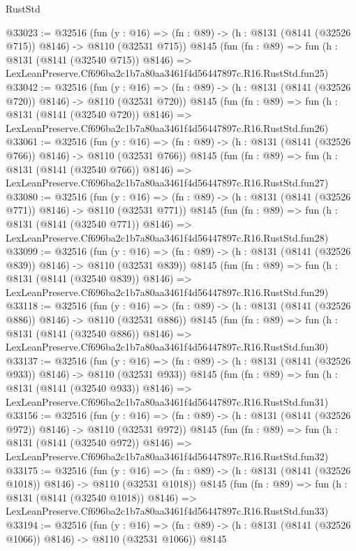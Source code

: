 \begin{lexlean}{RustStd}
\begin{coremodule}
@33023 := @32516
    (fun (y : @16) => (fn : @89) -> (h : @8131 (@8141 (@32526 @715)) @8146) -> @8110 (@32531 @715))
    @8145
    (fun (fn : @89) =>
    fun (h : @8131 (@8141 (@32540 @715)) @8146) =>
    LexLeanPreserve.Cf696ba2c1b7a80aa3461f4d56447897c.R16.RustStd.fun25)
@33042 := @32516
    (fun (y : @16) => (fn : @89) -> (h : @8131 (@8141 (@32526 @720)) @8146) -> @8110 (@32531 @720))
    @8145
    (fun (fn : @89) =>
    fun (h : @8131 (@8141 (@32540 @720)) @8146) =>
    LexLeanPreserve.Cf696ba2c1b7a80aa3461f4d56447897c.R16.RustStd.fun26)
@33061 := @32516
    (fun (y : @16) => (fn : @89) -> (h : @8131 (@8141 (@32526 @766)) @8146) -> @8110 (@32531 @766))
    @8145
    (fun (fn : @89) =>
    fun (h : @8131 (@8141 (@32540 @766)) @8146) =>
    LexLeanPreserve.Cf696ba2c1b7a80aa3461f4d56447897c.R16.RustStd.fun27)
@33080 := @32516
    (fun (y : @16) => (fn : @89) -> (h : @8131 (@8141 (@32526 @771)) @8146) -> @8110 (@32531 @771))
    @8145
    (fun (fn : @89) =>
    fun (h : @8131 (@8141 (@32540 @771)) @8146) =>
    LexLeanPreserve.Cf696ba2c1b7a80aa3461f4d56447897c.R16.RustStd.fun28)
@33099 := @32516
    (fun (y : @16) => (fn : @89) -> (h : @8131 (@8141 (@32526 @839)) @8146) -> @8110 (@32531 @839))
    @8145
    (fun (fn : @89) =>
    fun (h : @8131 (@8141 (@32540 @839)) @8146) =>
    LexLeanPreserve.Cf696ba2c1b7a80aa3461f4d56447897c.R16.RustStd.fun29)
@33118 := @32516
    (fun (y : @16) => (fn : @89) -> (h : @8131 (@8141 (@32526 @886)) @8146) -> @8110 (@32531 @886))
    @8145
    (fun (fn : @89) =>
    fun (h : @8131 (@8141 (@32540 @886)) @8146) =>
    LexLeanPreserve.Cf696ba2c1b7a80aa3461f4d56447897c.R16.RustStd.fun30)
@33137 := @32516
    (fun (y : @16) => (fn : @89) -> (h : @8131 (@8141 (@32526 @933)) @8146) -> @8110 (@32531 @933))
    @8145
    (fun (fn : @89) =>
    fun (h : @8131 (@8141 (@32540 @933)) @8146) =>
    LexLeanPreserve.Cf696ba2c1b7a80aa3461f4d56447897c.R16.RustStd.fun31)
@33156 := @32516
    (fun (y : @16) => (fn : @89) -> (h : @8131 (@8141 (@32526 @972)) @8146) -> @8110 (@32531 @972))
    @8145
    (fun (fn : @89) =>
    fun (h : @8131 (@8141 (@32540 @972)) @8146) =>
    LexLeanPreserve.Cf696ba2c1b7a80aa3461f4d56447897c.R16.RustStd.fun32)
@33175 := @32516
    (fun (y : @16) =>
    (fn : @89) -> (h : @8131 (@8141 (@32526 @1018)) @8146) -> @8110 (@32531 @1018))
    @8145
    (fun (fn : @89) =>
    fun (h : @8131 (@8141 (@32540 @1018)) @8146) =>
    LexLeanPreserve.Cf696ba2c1b7a80aa3461f4d56447897c.R16.RustStd.fun33)
@33194 := @32516
    (fun (y : @16) =>
    (fn : @89) -> (h : @8131 (@8141 (@32526 @1066)) @8146) -> @8110 (@32531 @1066))
    @8145

\end{coremodule}
\end{lexlean}
